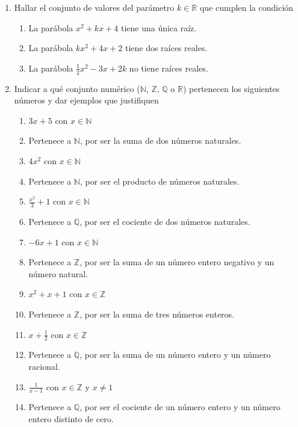 \documentclass[a4paper]{article}
\newcommand{\answer}{\item[**]}
\newcommand{\exercise}{\item}
\begin{document}
\begin{enumerate}
\begin{multicols}{2}
\begin{enumerate} [label=(\alph*)]
	\end{enumerate}
	\end{multicols}

	\exercise Hallar el conjunto de valores del parámetro $k \in \mathbb{R}$ que cumplen la condición
	\begin{enumerate} [label=(\alph*)]

		\item La parábola $x^2+kx+4$ tiene una única raíz.

		\item La parábola $kx^2+4x+2$ tiene dos raíces reales.

		\item La parábola $\displaystyle\frac{1}{2}x^2-3x+2k$ no tiene raíces reales.
	\end{enumerate}

	\exercise Indicar a qué conjunto numérico ($\mathbb{N}$, $\mathbb{Z}$, $\mathbb{Q}$ o $\mathbb{R}$) pertenecen los siguientes números y dar ejemplos que justifiquen
	\begin{multicols}{2}
	\begin{enumerate} [label=(\alph*)]
		\item $3x+5$ con $x \in \mathbb{N}$
		\answer Pertenece a $\mathbb{N}$, por ser la suma de dos números naturales.

		\item $4x^2$ con $x \in \mathbb{N}$
		\answer Pertenece a $\mathbb{N}$, por ser el producto de números naturales.

		\item $\displaystyle\frac{x^2}{3}+1$ con $x \in \mathbb{N}$
		\answer Pertenece a $\mathbb{Q}$, por ser el cociente de dos números naturales. 

		\item $-6x+1$ con $x \in \mathbb{N}$
		\answer Pertenece a $\mathbb{Z}$, por ser la suma de un número entero negativo y un número natural.

		\item $x^2+x+1$ con $x \in \mathbb{Z}$
		\answer Pertenece a $\mathbb{Z}$, por ser la suma de tres números enteros.

		\item $x+\displaystyle\frac{1}{2}$ con $x \in \mathbb{Z}$
		\answer Pertenece a $\mathbb{Q}$, por ser la suma de un número entero y un número racional.

		\item $\displaystyle\frac{1}{x-1}$ con $x \in \mathbb{Z}$ y $x \neq 1$
		\answer Pertenece a $\mathbb{Q}$, por ser el cociente de un número entero y un número entero distinto de cero.


\end{enumerate}
\end{multicols}
\end{enumerate}
\end{document}

